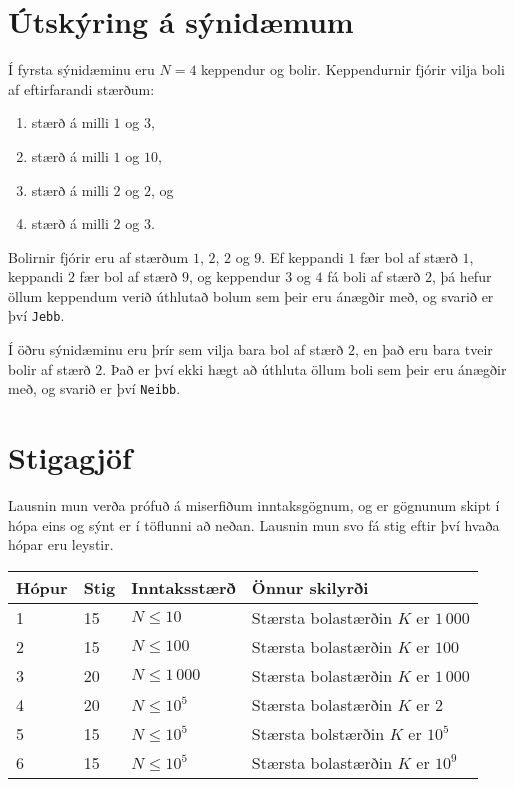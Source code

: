 \section*{Útskýring á sýnidæmum}
Í fyrsta sýnidæminu eru $N=4$ keppendur og bolir. Keppendurnir fjórir vilja boli af eftirfarandi stærðum:
\begin{enumerate}
    \item stærð á milli $1$ og $3$,
    \item stærð á milli $1$ og $10$,
    \item stærð á milli $2$ og $2$, og
    \item stærð á milli $2$ og $3$.
\end{enumerate}
Bolirnir fjórir eru af stærðum $1$, $2$, $2$ og $9$. Ef keppandi $1$ fær bol af stærð $1$, keppandi $2$ fær bol af stærð $9$, og keppendur $3$ og $4$ fá boli af stærð $2$, þá hefur öllum keppendum verið úthlutað bolum sem þeir eru ánægðir með, og svarið er því \texttt{Jebb}.

Í öðru sýnidæminu eru þrír sem vilja bara bol af stærð $2$, en það eru bara tveir bolir af stærð $2$. Það er því ekki hægt að úthluta öllum boli sem þeir eru ánægðir með, og svarið er því \texttt{Neibb}.

\section*{Stigagjöf}
Lausnin mun verða prófuð á miserfiðum inntaksgögnum, og er gögnunum skipt í
hópa eins og sýnt er í töflunni að neðan. Lausnin mun svo fá stig eftir því
hvaða hópar eru leystir.

\begin{tabular}{|l|l|l|l|}
\hline
Hópur & Stig & Inntaksstærð & Önnur skilyrði \\ \hline
1 & 15 & $N \leq 10$ & Stærsta bolastærðin $K$ er $1\,000$ \\ \hline
2 & 15 & $N \leq 100$ & Stærsta bolastærðin $K$ er $100$ \\ \hline
3 & 20 & $N \leq 1\,000$ & Stærsta bolastærðin $K$ er $1\,000$ \\ \hline
4 & 20 & $N \leq 10^5$ & Stærsta bolastærðin $K$ er $2$ \\ \hline
5 & 15 & $N \leq 10^5$ & Stærsta bolstærðin $K$ er $10^5$ \\ \hline
6 & 15 & $N \leq 10^5$ & Stærsta bolastærðin $K$ er $10^9$ \\ \hline
\end{tabular}
